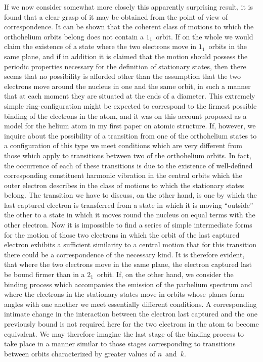 If we now consider somewhat more closely this apparently
surprising result, it is found that a clear grasp of it may be obtained
from the point of view of correspondence. It can be shown that
the coherent class of motions to which the orthohelium orbits
belong does not contain a $1_{1}$~orbit. If on the whole we would claim
the existence of a state where the two electrons move in $1_{1}$~orbits
in the same plane, and if in addition it is claimed that the motion
should possess the periodic properties necessary for the definition
of stationary states, then there seems that no possibility is afforded
other than the assumption that the two electrons move around the
nucleus in one and the same orbit, in such a manner that at each
moment they are situated at the ends of a diameter. This extremely
simple ring-configuration might be expected to correspond to
the firmest possible binding of the electrons in the atom, and it
was on this account proposed as a model for the helium atom in
my first paper on atomic structure. If, however, we inquire about
the possibility of a transition from one of the orthohelium states
to a configuration of this type we meet conditions which are very
different from those which apply to transitions between two of
the orthohelium orbits. In fact, the occurrence of each of these
transitions is due to the existence of well-defined corresponding
constituent harmonic vibration in the central orbits which the outer
electron describes in the class of motions to which the stationary
states belong. The transition we have to discuss, on the other
hand, is one by which the last captured electron is transferred from
a state in which it is moving ``outside'' the other to a state in which
it moves round the nucleus on equal terms with the other electron.
Now it is impossible to find a series of simple intermediate forms
for the motion of those two electrons in which the orbit of the last
captured electron exhibits a sufficient similarity to a central motion
that for this transition there could be a correspondence of the
necessary kind. It is therefore evident, that where the two electrons
move in the same plane, the electron captured last  be
bound firmer than in a $2_{1}$~orbit. If, on the other hand, we consider
the binding process which accompanies the emission of the parhelium
spectrum and where the electrons in the stationary states move in
orbits whose planes form angles with one another we meet essentially
different conditions. A corresponding intimate change in the
interaction between the electron last captured and the one previously
bound is not required here for the two electrons in the atom to
become equivalent. We may therefore imagine the last stage of
the binding process to take place in a manner similar to those
stages corresponding to transitions between orbits characterized by
greater values of $n$~and~$k$.

